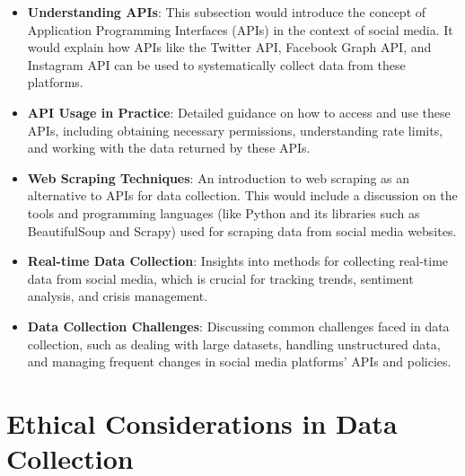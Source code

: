 \documentclass[
]{book}
\providecommand{\tightlist}{%
  \setlength{\itemsep}{0pt}\setlength{\parskip}{0pt}}
\begin{document}
\begin{itemize}
\tightlist
\item
  \textbf{Understanding APIs}: This subsection would introduce the concept of Application Programming Interfaces (APIs) in the context of social media. It would explain how APIs like the Twitter API, Facebook Graph API, and Instagram API can be used to systematically collect data from these platforms.
\item
  \textbf{API Usage in Practice}: Detailed guidance on how to access and use these APIs, including obtaining necessary permissions, understanding rate limits, and working with the data returned by these APIs.
\item
  \textbf{Web Scraping Techniques}: An introduction to web scraping as an alternative to APIs for data collection. This would include a discussion on the tools and programming languages (like Python and its libraries such as BeautifulSoup and Scrapy) used for scraping data from social media websites.
\item
  \textbf{Real-time Data Collection}: Insights into methods for collecting real-time data from social media, which is crucial for tracking trends, sentiment analysis, and crisis management.
\item
  \textbf{Data Collection Challenges}: Discussing common challenges faced in data collection, such as dealing with large datasets, handling unstructured data, and managing frequent changes in social media platforms' APIs and policies.
\end{itemize}

\hypertarget{ethical-considerations-in-data-collection}{%
\section*{Ethical Considerations in Data Collection}\label{ethical-considerations-in-data-collection}}
\end{document}

